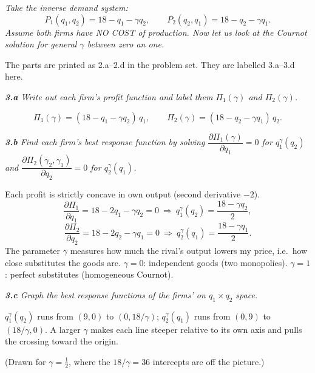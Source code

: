 \documentclass[11pt]{article}
\newcommand{\question}[1]{\par\smallskip\noindent\colorbox{black!6}{\parbox{\dimexpr\linewidth-2\fboxsep}{\itshape #1}}\par\smallskip}
\begin{document}
\question{Take the inverse demand system:
\[
P_1(q_1,q_2)=18-q_1-\gamma q_2,\qquad P_2(q_2,q_1)=18-q_2-\gamma q_1 .
\]
Assume both firms have NO COST of production. Now let us look at the Cournot solution for general $\gamma$ between zero an one.}

The parts are printed as 2.a--2.d in the problem set. They are labelled 3.a--3.d here.

\question{\textbf{3.a} Write out each firm's profit function and label them $\Pi_1(\gamma)$ and $\Pi_2(\gamma)$.}

\[
\Pi_1(\gamma)=(18-q_1-\gamma q_2)\,q_1,\qquad \Pi_2(\gamma)=(18-q_2-\gamma q_1)\,q_2 .
\]

\question{\textbf{3.b} Find each firm's best response function by solving $\dfrac{\partial\Pi_1(\gamma)}{\partial q_1}=0$ for $q_1^\gamma(q_2)$ and $\dfrac{\partial\Pi_2(\gamma_2,\gamma_1)}{\partial q_2}=0$ for $q_2^\gamma(q_1)$.}

Each profit is strictly concave in own output (second derivative $-2$).
\[
\frac{\partial\Pi_1}{\partial q_1}=18-2q_1-\gamma q_2=0\ \Longrightarrow\ q_1^\gamma(q_2)=\frac{18-\gamma q_2}{2},
\]
\[
\frac{\partial\Pi_2}{\partial q_2}=18-2q_2-\gamma q_1=0\ \Longrightarrow\ q_2^\gamma(q_1)=\frac{18-\gamma q_1}{2}.
\]
The parameter $\gamma$ measures how much the rival's output lowers my price, i.e.\ how close substitutes the goods are. $\gamma=0$: independent goods (two monopolies). $\gamma=1$: perfect substitutes (homogeneous Cournot).

\question{\textbf{3.c} Graph the best response functions of the firms' on $q_1\times q_2$ space.}

$q_1^\gamma(q_2)$ runs from $(9,0)$ to $(0,18/\gamma)$; $q_2^\gamma(q_1)$ runs from $(0,9)$ to $(18/\gamma,0)$. A larger $\gamma$ makes each line steeper relative to its own axis and pulls the crossing toward the origin.

\begin{center}
\end{center}
(Drawn for $\gamma=\tfrac12$, where the $18/\gamma=36$ intercepts are off the picture.)
\end{document}
